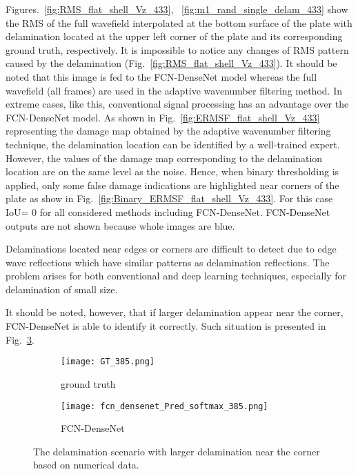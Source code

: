 Figures.~\ref{fig:RMS_flat_shell_Vz_433}, ~\ref{fig:m1_rand_single_delam_433} show the RMS of the full wavefield interpolated at the bottom surface of the plate with delamination located at the upper left corner of the plate and its corresponding ground truth, respectively.
It is impossible to notice any changes of RMS pattern caused by the delamination (Fig.~\ref{fig:RMS_flat_shell_Vz_433}).
It should be noted that this image is fed to the FCN-DenseNet model whereas the full wavefield (all frames) are used in the adaptive wavenumber filtering method.
In extreme cases, like this, conventional signal processing has an advantage over the FCN-DenseNet model.
As shown in Fig.~\ref{fig:ERMSF_flat_shell_Vz_433} representing the damage map obtained by the adaptive wavenumber filtering technique, the delamination location can be identified by a well-trained expert. 
However, the values of the damage map corresponding to the delamination location are on the same level as the noise.
Hence, when binary thresholding is applied, only some false damage indications are highlighted near corners of the plate as show in Fig.~\ref{fig:Binary_ERMSF_flat_shell_Vz_433}. 
For this case IoU= \(0\) for all considered methods including FCN-DenseNet.
FCN-DenseNet outputs are not shown because whole images are blue.
 
Delaminations located near edges or corners are difficult to detect due to edge wave reflections which have similar patterns as delamination reflections. 
The problem arises for both conventional and deep learning techniques, especially for delamination of small size. 

It should be noted, however, that if larger delamination appear near the corner, FCN-DenseNet is able to identify it correctly.
Such situation is presented in Fig.~\ref{fig:corner_delam}.	

\begin{figure}[!h]
	\centering
	\begin{subfigure}[b]{0.47\textwidth}
		\centering
		\texttt{[image: GT\_385.png]}
		\caption{ground truth}
		\label{fig:GT_385}
	\end{subfigure}
	\hfill
	\begin{subfigure}[b]{0.47\textwidth}
		\centering
		\texttt{[image: fcn\_densenet\_Pred\_softmax\_385.png]}
		\caption{FCN-DenseNet}
		\label{fig:FCN-DenseNet_385}
	\end{subfigure}
	\caption{The delamination scenario with larger delamination near the corner based on numerical data.}
	\label{fig:corner_delam}
\end{figure} 

